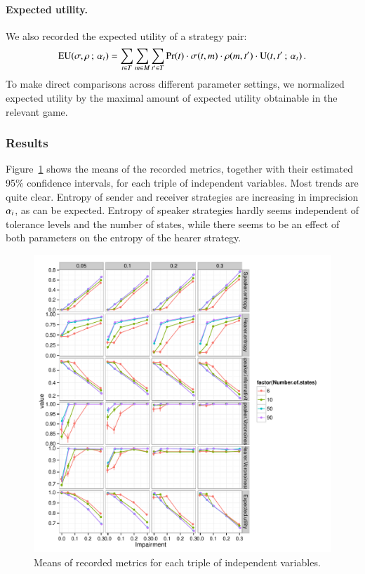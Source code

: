 \paragraph{Expected utility.} We also recorded the expected utility of
a strategy pair:
\begin{align*}
  \mathrm{EU}(\sigma,\rho \thinspace ; \thinspace \alpha_t) = \sum_{t \in
    T} \sum_{m \in M} \sum_{t' \in T}
  \Pr(t) \cdot \sigma(t, m) \cdot \rho(m,
  t') \cdot \mathrm{U}(t,t' \thinspace ; \thinspace \alpha_t)\,.
\end{align*}
To make direct comparisons across different parameter settings, we
normalized expected utility by the maximal amount of expected utility
obtainable in the relevant game.

\subsubsection{Results}
Figure~\ref{fig:MeanMetrics} shows the means of the recorded metrics,
together with their estimated 95\% confidence intervals, for each
triple of independent variables. Most trends are quite clear. Entropy
of sender and receiver strategies are increasing in imprecision
$\alpha_i$, as can be expected. Entropy of speaker strategies
hardly seems independent of tolerance levels and the number of states,
while there seems to be an effect of both parameters on the entropy of
the hearer strategy. 

\begin{figure}
  \centering
  
  \includegraphics[width=\textwidth]{plots/MeanMetrics.pdf}

  \caption{Means of recorded metrics for each triple of independent variables.}
  \label{fig:MeanMetrics}
\end{figure}

